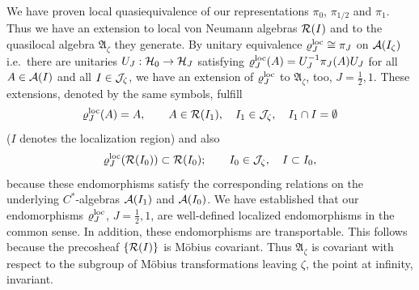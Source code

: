 \documentclass[10pt,a4paper]{article}
\begin{document}
We have proven local quasiequivalence of our
representations $\pi_0$, $\pi_{1/2}$ and $\pi_1$.
Thus we have an extension to local von Neumann
algebras ${\cal R}(I)$ and to the quasilocal algebra
$\mathfrak{A}_\zeta$ they generate. By unitary
equivalence $\varrho_J^{\rm loc}\cong\pi_J$ on
${\cal A}(I_\zeta)$ i.e.~there are unitaries
$U_J:{\cal H}_0\rightarrow{\cal H}_J$ satisfying
$\varrho_J^{\rm loc}(A)=U_J^{-1}\pi_J(A)U_J$ for all
$A\in{\cal A}(I)$ and all $I\in{\cal J}_\zeta$, we
have an extension of $\varrho_J^{\rm loc}$ to
$\mathfrak{A}_\zeta$, too, $J=\frac{1}{2},1$. These
extensions, denoted by the same symbols, fulfill
\[ \varrho_J^{\rm loc}(A)=A, \qquad
A\in{\cal R}(I_1),\quad I_1\in{\cal J}_\zeta,
\quad I_1\cap I=\emptyset \]
($I$ denotes the localization region) and also
\[ \varrho_J^{\rm loc}({\cal R}(I_0)) \subset
{\cal R}(I_0);\qquad I_0\in{\cal J}_\zeta,\quad
I\subset I_0, \]
because these endomorphisms satisfy the
corresponding relations on the underlying
$C^*$-algebras ${\cal A}(I_1)$ and ${\cal A}(I_0)$.
We have established that our endomorphisms
$\varrho_J^{\rm loc}$, $J=\frac{1}{2},1$, are
well-defined localized endomorphisms in the
common sense. In addition, these endomorphisms
are transportable. This follows because the
precosheaf $\{{\cal R}(I)\}$ is M{\"o}bius covariant.
Thus $\mathfrak{A}_\zeta$ is covariant with respect to
the subgroup of M{\"o}bius transformations leaving
$\zeta$, the point at infinity, invariant.
\end{document}
